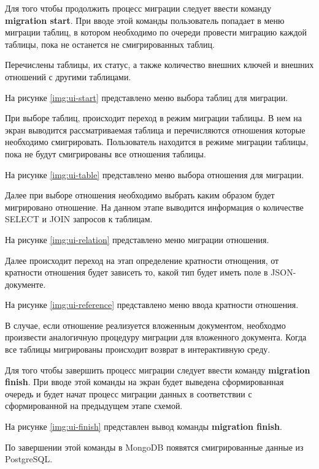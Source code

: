 Для того чтобы продолжить процесс миграции следует ввести команду \textbf{migration start}.
При вводе этой команды пользователь попадает в меню миграции таблиц, 
в котором необходимо по очереди провести миграцию каждой таблицы, 
пока не останется не смигрированных таблиц.

Перечислены таблицы, их статус, а также количество внешних ключей и внешних отношений с другими таблицами.

На рисунке \ref{img:ui-start} представлено меню выбора таблиц для миграции.

\clearpage

При выборе таблиц, происходит переход в режим миграции таблицы.
В нем на экран выводится рассматриваемая таблица и перечисляются отношения которые необходимо смигрировать.
Пользователь находится в режиме миграции таблицы, пока не будут смигрированы все отношения таблицы.

На рисунке \ref{img:ui-table} представлено меню выбора отношения для миграции.

\clearpage

Далее при выборе отношения необходимо выбрать каким образом будет мигрировано отношение.
На данном этапе выводится информация о количестве SELECT и JOIN запросов к таблицам.

На рисунке \ref{img:ui-relation} представлено меню миграции отношения.

Далее происходит переход на этап определение кратности отнощения, 
от кратности отношения будет зависеть то, какой тип будет иметь поле в JSON-документе.

\clearpage

На рисунке \ref{img:ui-reference} представлено меню ввода кратности отношения.


В случае, если отношение реализуется вложенным документом, 
необходмо произвести аналогичную процедуру миграции для вложенного документа.
Когда все таблицы мигрированы происходит возврат в интерактивную среду.

Для того чтобы завершить процесс миграции следует ввести команду \textbf{migration finish}.
При вводе этой команды на экран будет выведена сформированная очередь и будет начат процесс миграции данных
в соответствии с сформированной на предыдущем этапе схемой.

На рисунке \ref{img:ui-finish} представлен вывод команды \textbf{migration finish}.

По завершении этой команды в MongoDB появятся смигрированные данные из PostgreSQL.

